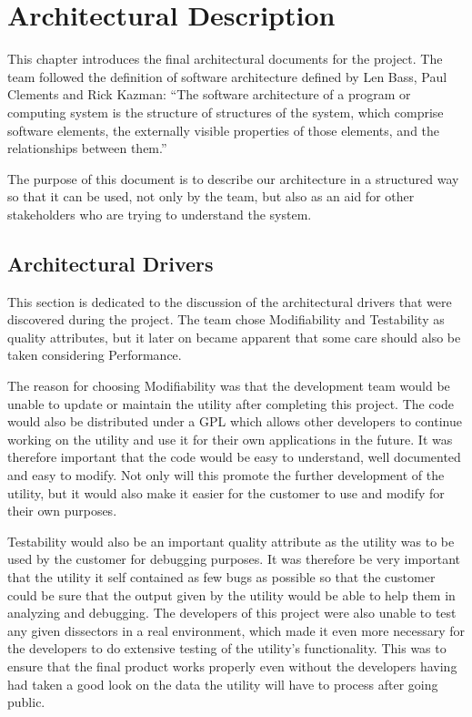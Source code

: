 \chapter{Architectural Description}
This chapter introduces the final architectural documents for the project. The team followed the definition of software architecture defined by Len Bass, Paul Clements and Rick Kazman: ``The software architecture of a program or computing
system is the structure of structures of the system, which comprise software elements, the externally visible properties of those elements, and the relationships between them.''~\cite[p.3]{Bass2003}

The purpose of this document is to describe our architecture in a structured way so that it can be used, not only by the team, but also as an aid for other stakeholders who are trying to understand the system.

\section{Architectural Drivers}
This section is dedicated to the discussion of the architectural drivers that were discovered during the project.
The team chose Modifiability and Testability as quality attributes, but it later on became apparent that some care should also be taken considering Performance.

The reason for choosing Modifiability was that the development team would be unable to update or maintain the \gls{utility} after completing this project. The code would also be distributed under a GPL which allows other developers to continue working on the utility and use it for their own applications in the future. It was therefore important that the code would be easy to understand, well documented and easy to modify. Not only will this promote the further development of the utility, but it would also make it easier for the customer to use and modify for their own purposes.

Testability would also be an important quality attribute as the \gls{utility} was to be used by the customer for debugging purposes. It was therefore be very important that the utility it self contained as few bugs as possible so that the customer could be sure that the output given by the utility would be able to help them in analyzing and debugging. The developers of this project were also unable to test any given \glspl{dissector} in a real environment, which made it even more necessary for the developers to do extensive testing of the utility's functionality. This was to ensure that the final product works properly even without the developers having had taken a good look on the data the utility will have to process after going public.

